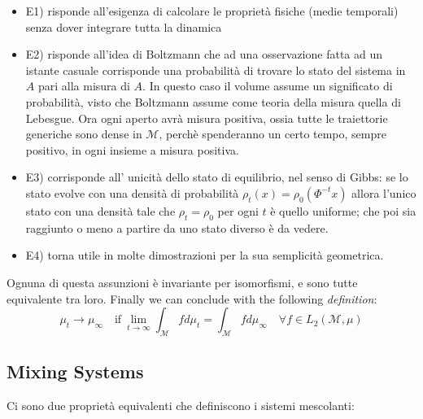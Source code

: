 \documentclass{article}
\begin{document}
\begin{itemize}

\item E1) risponde all'esigenza di calcolare le proprietà fisiche (medie temporali) senza dover integrare tutta la dinamica

\item E2) risponde all'idea di Boltzmann che ad una osservazione fatta ad un istante casuale corrisponde una probabilità di trovare lo stato del sistema in $A$ pari alla misura di $A$. In questo caso il volume assume un significato di probabilità, visto che Boltzmann assume come teoria della misura quella di Lebesgue. Ora ogni aperto avrà misura positiva, ossia tutte le traiettorie generiche sono dense in $\mathcal{M}$, perchè spenderanno un certo tempo, sempre positivo, in ogni insieme a misura positiva.

\item E3) corrisponde all' unicità dello stato di equilibrio, nel senso di Gibbs: se lo stato evolve con una densità di probabilità $\rho_t(x) = \rho_0(\Phi^{-t} x)$ allora l'unico stato con una densità tale che $\rho_t = \rho_0$ per ogni $t$ è quello uniforme; che poi sia raggiunto o meno a partire da uno stato diverso è da vedere.

\item E4) torna utile in molte dimostrazioni per la sua semplicità geometrica.

\end{itemize}

Ognuna di questa assunzioni è invariante per isomorfismi, e sono tutte equivalente tra loro.
\newline 
Finally we can conclude with the following  \textit{definition}:
$$ \mu_t \to \mu_{\infty} \quad  \mathrm{ if } \: \lim\limits_{t \to \infty} \int_{\mathcal{M}} f d \mu_t = \int_{\mathcal{M}} f d \mu_{\infty} \quad \forall f \in L_2(\mathcal{M},\mu)$$


\subsection{Mixing Systems}
Ci sono due proprietà equivalenti che definiscono i sistemi mescolanti:
\end{document}
